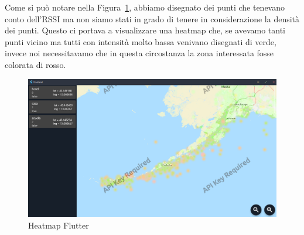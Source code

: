 \documentclass[a4paper]{article}
\begin{document}
Come si può notare nella Figura~\ref{heatmap_flutter}, abbiamo disegnato dei punti che tenevano conto dell'RSSI ma non siamo stati in grado di tenere in considerazione la densità dei punti. Questo ci portava a visualizzare una heatmap che, se avevamo tanti punti vicino ma tutti con intensità molto bassa venivano disegnati di verde, invece noi necessitavamo che in questa circostanza la zona interessata fosse colorata di rosso. 
\begin{figure}[tbp]
    \centering
    \includegraphics[width=\textwidth]{figure/heatmap_flutter.png}
    \caption{Heatmap Flutter}
    \label{heatmap_flutter}
\end{figure}

\printbibliography
\end{document}
